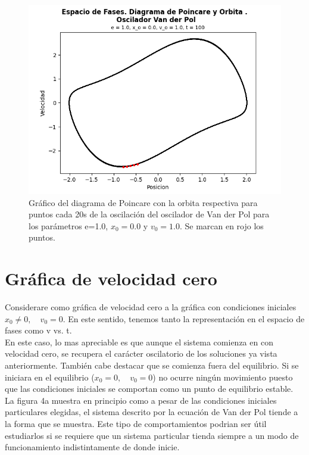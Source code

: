 \documentclass{article}
\begin{document}
	\begin{figure}[h!]
		\centering
		\ContinuedFloat
		\includegraphics[width=0.8\linewidth]{DIAGRAMA DE POINCARE Y ORBITA 2}
		\caption{Gr\'afico del diagrama de Poincare con la orbita respectiva para puntos cada 20s de la oscilaci\'on del oscilador de Van der Pol para los par\'ametros e=1.0, $x_0=0.0$ y $v_0=1.0$. Se marcan en rojo los puntos.}
	\end{figure}
	
	\newpage
	
	\section{Gráfica de velocidad cero}
	
	Considerare como gr\'afica de velocidad cero a la gr\'afica con condiciones iniciales $x_0\neq0,\quad v_0=0$. En este sentido, tenemos tanto la representación en el espacio de fases como v vs. t.\\
	
	En este caso, lo mas apreciable es que aunque el sistema comienza en con velocidad cero, se recupera el carácter oscilatorio de los soluciones ya vista anteriormente. También cabe destacar que se comienza fuera del equilibrio. Si se iniciara en el equilibrio ($x_0=0,\quad v_0=0$) no ocurre ningún movimiento puesto que las condiciones iniciales se comportan como un punto de equilibrio estable.\\
	
	La figura 4a muestra en principio como a pesar de las condiciones iniciales particulares elegidas, el sistema descrito por la ecuaci\'on de Van der Pol tiende a la forma que se muestra. Este tipo de comportamientos podrian ser útil estudiarlos si se requiere que un sistema particular tienda siempre a un modo de funcionamiento indistintamente de donde inicie. \\
	
\end{document}
